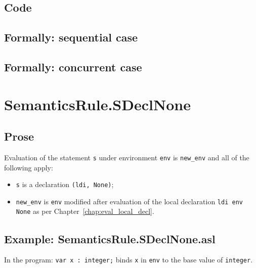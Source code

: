 \documentclass{book}
\begin{document}
  \subsection{Code}

\begin{emptyformal}
  \subsection{Formally: sequential case}

  \subsection{Formally: concurrent case}
\end{emptyformal}


\section{SemanticsRule.SDeclNone \label{sec:SemanticsRule.SDeclNone}}

    \subsection{Prose}
  Evaluation of the statement \texttt{s} under environment \texttt{env} is
\texttt{new\_env} and all of the following apply:
    \begin{itemize}
    \item \texttt{s} is a declaration \texttt{(ldi, None)};
    \item \texttt{new\_env} is \texttt{env} modified after evaluation of the local declaration
      \texttt{ldi env None} as per Chapter~\ref{chap:eval_local_decl}. 
    \end{itemize}

    \subsection{Example: SemanticsRule.SDeclNone.asl}
    In the program:
    \texttt{var x : integer;} binds \texttt{x} in \texttt{env} to the base value of \texttt{integer}.
\end{document}
